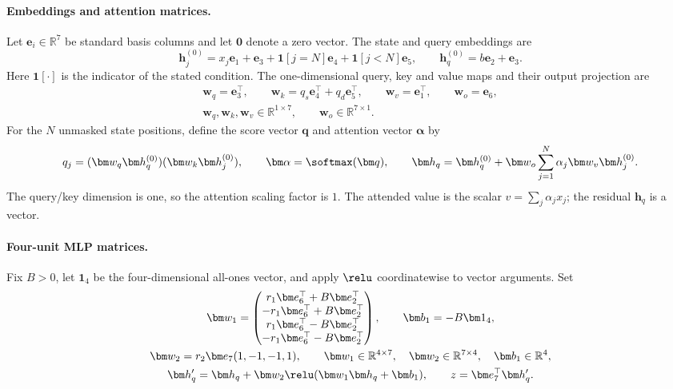 \paragraph{Embeddings and attention matrices.}
Let $\bm e_i\in\mathbb R^7$ be standard basis columns and let $\bm0$ denote a zero vector.
The state and query embeddings are
\begin{equation}
 \bm h_j^{(0)}=x_j\bm e_1+\bm e_3+\mathbf1[j=N]\bm e_4+\mathbf1[j<N]\bm e_5,
 \qquad \bm h_q^{(0)}=b\bm e_2+\bm e_3.
 \label{eq:embeddings}
\end{equation}
Here $\mathbf1[\cdot]$ is the indicator of the stated condition.
The one-dimensional query, key and value maps and their output projection are
\begin{equation}
 \begin{gathered}
 \bm w_q=\bm e_3^\top,\qquad
 \bm w_k=q_s\bm e_4^\top+q_d\bm e_5^\top,\qquad
 \bm w_v=\bm e_1^\top,\qquad \bm w_o=\bm e_6,\\
 \bm w_q,\bm w_k,\bm w_v\in\mathbb R^{1\times7},\qquad
 \bm w_o\in\mathbb R^{7\times1}.
 \end{gathered}
 \label{eq:attention-matrices}
\end{equation}
For the $N$ unmasked state positions, define the score vector $\bm q$ and attention vector $\bm\alpha$ by
\begin{equation}
 q_j=(\bm w_q\bm h_q^{(0)})(\bm w_k\bm h_j^{(0)}),\qquad
 \bm\alpha=\softmax(\bm q),\qquad
 \bm h_q=\bm h_q^{(0)}+\bm w_o\sum_{j=1}^N \alpha_j\bm w_v\bm h_j^{(0)}.
 \label{eq:attention-block}
\end{equation}
The query/key dimension is one, so the attention scaling factor is $1$.
The attended value is the scalar $v=\sum_j \alpha_j x_j$; the residual $\bm h_q$ is a vector.

\paragraph{Four-unit MLP matrices.}
Fix $B>0$, let $\bm1_4$ be the four-dimensional all-ones vector, and apply $\relu$ coordinatewise to vector arguments. Set
\begin{equation}
 \begin{gathered}
 \bm w_1=\begin{pmatrix}
 r_1\bm e_6^\top+B\bm e_2^\top\\
 -r_1\bm e_6^\top+B\bm e_2^\top\\
 r_1\bm e_6^\top-B\bm e_2^\top\\
 -r_1\bm e_6^\top-B\bm e_2^\top
 \end{pmatrix},\qquad
 \bm b_1=-B\bm1_4,\\
 \bm w_2=r_2\bm e_7(1,-1,-1,1),\qquad
 \bm w_1\in\mathbb R^{4\times7},\quad
 \bm w_2\in\mathbb R^{7\times4},\quad \bm b_1\in\mathbb R^4,\\
 \bm h'_q=\bm h_q+\bm w_2\relu(\bm w_1\bm h_q+\bm b_1),
 \qquad z=\bm e_7^\top\bm h'_q.
 \end{gathered}
 \label{eq:mlp-matrices}
\end{equation}
